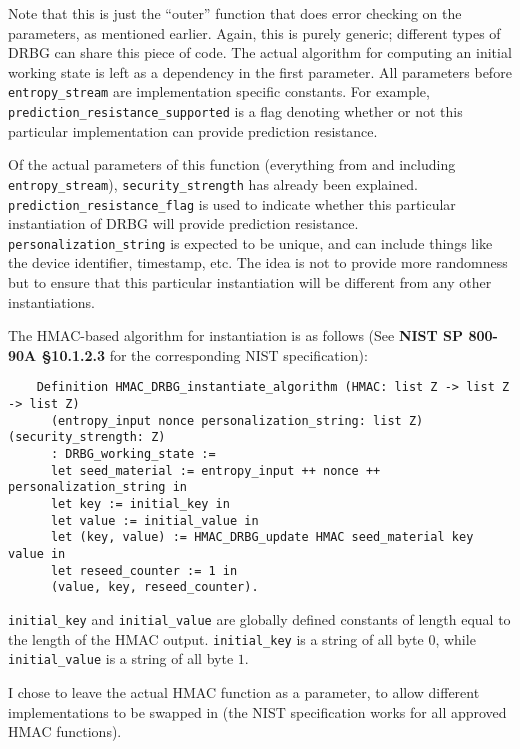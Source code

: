 \documentclass[pageno]{jpaper}
\newcommand{\stdtitle}[1]{\textbf{#1}}
\begin{document}
Note that this is just the “outer” function that does error checking on the parameters, as mentioned earlier. Again, this is purely generic; different types of DRBG can share this piece of code. The actual algorithm for computing an initial working state is left as a dependency in the first parameter. All parameters before \lstinline{entropy_stream} are implementation specific constants. For example, \lstinline{prediction_resistance_supported} is a flag denoting whether or not this particular implementation can provide prediction resistance.

Of the actual parameters of this function (everything from and including \lstinline{entropy_stream}), \lstinline{security_strength} has already been explained. \lstinline{prediction_resistance_flag} is used to indicate whether this particular instantiation of DRBG will provide prediction resistance. \lstinline{personalization_string} is expected to be unique, and can include things like the device identifier, timestamp, etc. The idea is not to provide more randomness but to ensure that this particular instantiation will be different from any other instantiations.

The HMAC-based algorithm for instantiation is as follows (See \stdtitle{NIST SP 800-90A \S 10.1.2.3} for the corresponding NIST specification):

\begin{lstlisting}
    Definition HMAC_DRBG_instantiate_algorithm (HMAC: list Z -> list Z -> list Z)
      (entropy_input nonce personalization_string: list Z) (security_strength: Z)
      : DRBG_working_state :=
      let seed_material := entropy_input ++ nonce ++ personalization_string in
      let key := initial_key in
      let value := initial_value in
      let (key, value) := HMAC_DRBG_update HMAC seed_material key value in
      let reseed_counter := 1 in
      (value, key, reseed_counter).
\end{lstlisting}


\lstinline{initial_key} and \lstinline{initial_value} are globally defined constants of length equal to the length of the HMAC output. \lstinline{initial_key} is a string of all byte $0$, while \lstinline{initial_value} is a string of all byte $1$.

I chose to leave the actual HMAC function as a parameter, to allow different implementations to be swapped in (the NIST specification works for all approved HMAC functions).
\end{document}
